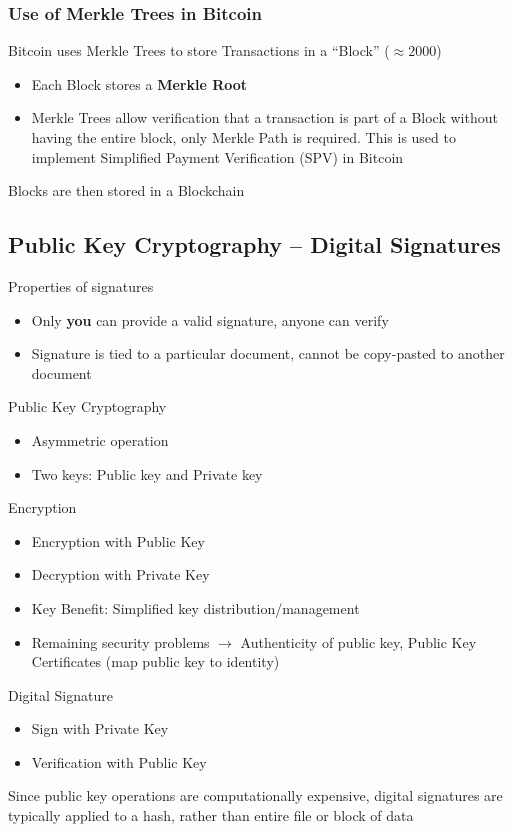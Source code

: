 \subsubsection{Use of Merkle Trees in Bitcoin}
Bitcoin uses Merkle Trees to store Transactions in a ``Block'' ($\approx2000$)
\begin{itemize}
	\item Each Block stores a \textbf{Merkle Root}
	\item Merkle Trees allow verification that a transaction is part of a Block without having the entire block, only Merkle Path is required. This is used to implement Simplified Payment Verification (SPV) in Bitcoin
\end{itemize}
Blocks are then stored in a Blockchain

\subsection{Public Key Cryptography -- Digital Signatures}
Properties of signatures
\begin{itemize}
	\item Only \textbf{you} can provide a valid signature, anyone can verify
	\item Signature is tied to a particular document, cannot be copy-pasted to another document
\end{itemize}
Public Key Cryptography
\begin{itemize}
	\item Asymmetric operation
	\item Two keys: Public key and Private key
\end{itemize}
Encryption
\begin{itemize}
	\item Encryption with Public Key
	\item Decryption with Private Key
	\item Key Benefit: Simplified key distribution/management
	\item Remaining security problems $\rightarrow$ Authenticity of public key, Public Key Certificates (map public key to identity)
\end{itemize}
Digital Signature
\begin{itemize}
	\item Sign with Private Key
	\item Verification with Public Key
\end{itemize}
\begin{leftbar}
	Since public key operations are computationally expensive, digital signatures are typically applied to a hash, rather than entire file or block of data
\end{leftbar}

